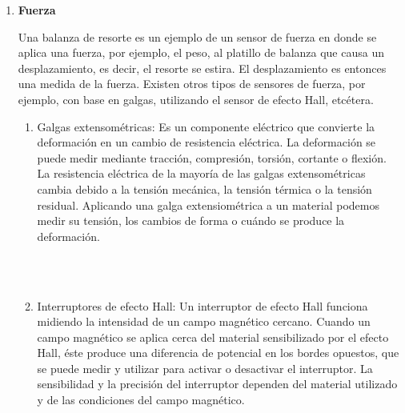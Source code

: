 \begin{enumerate}
			\item \textbf{Fuerza}
			
			Una balanza de resorte es un ejemplo de un sensor de fuerza en donde se aplica una fuerza, por ejemplo, el peso, al platillo de balanza que causa un desplazamiento, es decir, el resorte se estira. El desplazamiento es entonces una medida de la fuerza. Existen otros tipos de sensores de fuerza, por ejemplo, con base en galgas, utilizando el sensor de efecto Hall, etcétera. \cite{saha2010robotics}\\
			\begin{enumerate}
				\item Galgas extensométricas: Es un componente eléctrico que convierte la deformación en un cambio de resistencia eléctrica. La deformación se puede medir mediante tracción, compresión, torsión, cortante o flexión. La resistencia eléctrica de la mayoría de las galgas extensométricas cambia debido a la tensión mecánica, la tensión térmica o la tensión residual. Aplicando una galga extensiométrica a un material podemos medir su tensión, los cambios de forma o cuándo se produce la deformación. \cite{Galgas}\\
				
				\begin{figure}[h]
					\centering
					\\
					\hfill
					\\

				\end{figure}
				
				\item Interruptores de efecto Hall: Un interruptor de efecto Hall funciona midiendo la intensidad de un campo magnético cercano. Cuando un campo magnético se aplica cerca del material sensibilizado por el efecto Hall, éste produce una diferencia de potencial en los bordes opuestos, que se puede medir y utilizar para activar o desactivar el interruptor. La sensibilidad y la precisión del interruptor dependen del material utilizado y de las condiciones del campo magnético.\cite{Efecto_Hall}\\
				\\
				\\
				\\
				\\
				
				\begin{figure}[h]
					\centering
					\hfill
				\end{figure}
				

\end{enumerate}
\end{enumerate}
